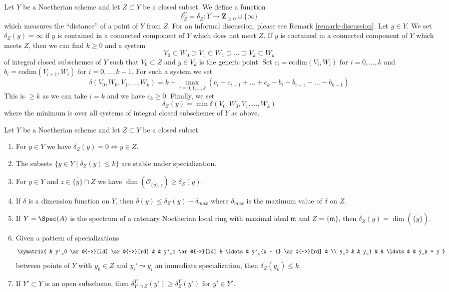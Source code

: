 \noindent
Let $Y$ be a Noetherian scheme and let $Z \subset Y$ be a closed subset.
We define a function
\begin{equation}
\label{equation-delta-Z}
\delta^Y_Z = \delta_Z : Y \longrightarrow \mathbf{Z}_{\geq 0} \cup \{\infty\}
\end{equation}
which measures the ``distance'' of a point of $Y$ from $Z$.
For an informal discussion, please see Remark \ref{remark-discussion}.
Let $y \in Y$. We set $\delta_Z(y) = \infty$ if $y$ is contained
in a connected component of $Y$ which does not meet $Z$.
If $y$ is contained in a connected component of $Y$ which meets $Z$,
then we can find $k \geq 0$ and a system
$$
V_0 \subset W_0 \supset V_1 \subset W_1 \supset \ldots \supset
V_k \subset W_k
$$
of integral closed subschemes of $Y$ such that $V_0 \subset Z$
and $y \in V_k$ is the generic point. Set
$c_i = \text{codim}(V_i, W_i)$ for $i = 0, \ldots, k$
and $b_i = \text{codim}(V_{i + 1}, W_i)$ for $i = 0, \ldots, k - 1$.
For such a system we set
$$
\delta(V_0, W_0, V_1, \ldots, W_k) =
k +
\max_{i = 0, 1, \ldots, k}
(c_i + c_{i + 1} + \ldots + c_k - b_i - b_{i + 1} - \ldots - b_{k - 1})
$$
This is $\geq k$ as we can take $i = k$ and we have $c_k \geq 0$.
Finally, we set
$$
\delta_Z(y) = \min \delta(V_0, W_0, V_1, \ldots, W_k)
$$
where the minimum is over all systems of integral closed subschemes of $Y$
as above.

\begin{lemma}
\label{lemma-discussion}
Let $Y$ be a Noetherian scheme and let $Z \subset Y$ be a closed subset.
\begin{enumerate}
\item For $y \in Y$ we have $\delta_Z(y) = 0 \Leftrightarrow y \in Z$.
\item The subsets $\{y \in Y \mid \delta_Z(y) \leq k\}$ are
stable under specialization.
\item For $y \in Y$ and $z \in \overline{\{y\}} \cap Z$ we have
$\dim(\mathcal{O}_{\overline{\{y\}}, z}) \geq \delta_Z(y)$.
\item If $\delta$ is a dimension function on $Y$, then
$\delta(y) \leq \delta_Z(y) + \delta_{max}$ where $\delta_{max}$
is the maximum value of $\delta$ on $Z$.
\item If $Y = \Spec(A)$ is the spectrum of a catenary Noetherian local ring
with maximal ideal $\mathfrak m$ and $Z = \{\mathfrak m\}$, then
$\delta_Z(y) = \dim(\overline{\{y\}})$.
\item Given a pattern of specializations
$$
\xymatrix{
& y'_0 \ar@{~>}[ld] \ar@{~>}[rd] &
& y'_1 \ar@{~>}[ld] & \ldots
& y'_{k - 1} \ar@{~>}[rd] &
\\
y_0 & &
y_1 & &
\ldots & &
y_k = y
}
$$
between points of $Y$ with $y_0 \in Z$ and $y_i' \leadsto y_i$
an immediate specialization, then $\delta_Z(y_k) \leq k$.
\item If $Y' \subset Y$ is an open subscheme, then
$\delta^{Y'}_{Y' \cap Z}(y') \geq \delta^Y_Z(y')$ for $y' \in Y'$.
\end{enumerate}
\end{lemma}

